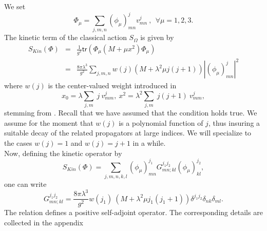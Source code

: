 \documentclass[10pt]{book}
\newcommand{\tr}{\mathsf{tr}}
\theoremstyle{break}
\begin{document}


We set%
%
\begin{equation*}
\Phi_\mu = \sum_{j,m,n} (\phi_\mu)^j_{mn} v^j_{mn} \ , \ \ \forall \mu=1,2,3.
\end{equation*}
%
The kinetic term of the classical action %
$S_\Omega$ is given by%
%
\begin{eqnarray*}
S_{Kin}(\Phi) &=& \frac{1}{g^2} \tr( \Phi_\mu (M+\mu x^2) \Phi_\mu)%
\\
&=& \frac{8\pi\lambda^3}{g^2} \sum_{j,m,n} w(j) (M+\lambda^2\mu j(j+1)) |(\phi_\mu)^j_{mn}|^2 %
\end{eqnarray*}
%
where $w(j)$ is the center-valued weight introduced in %
\begin{equation*}
x_0 = \lambda\sum_{j,m} \ j \ v^j_{mm},\ x^2 = \lambda^2\sum_{j,m} \ j(j+1) \ v^j_{mm},%
\end{equation*}
stemming from %
. Recall that we have assumed that the condition %
holds true. We assume for the moment that $w(j)$ is a polynomial function of $j$, thus insuring a suitable decay of the related propagators at large indices. We will specialize to the cases $w(j)=1$ and $w(j)=j+1$ in a while.\\
Now, defining the kinetic operator by
\begin{equation*}
S_{Kin}(\Phi)=\sum_{j,m,n,k,l}(\phi_\mu)^{j_1}_{mn}G^{j_1j_2}_{mn;kl}(\phi_\mu)^{j_2}_{kl},
\end{equation*}
one can write 
%
\begin{equation*}
G^{j_1j_2}_{mn;kl} = \frac{8\pi\lambda^3}{g^2} w(j_1) \ \left(M+\lambda^2\mu j_1(j_1+1)\right) \delta^{j_1j_2} \delta_{nk} \delta_{ml}.%
\end{equation*}
The relation %
defines a positive self-adjoint operator. The corresponding details are collected in the appendix %
\end{document}
